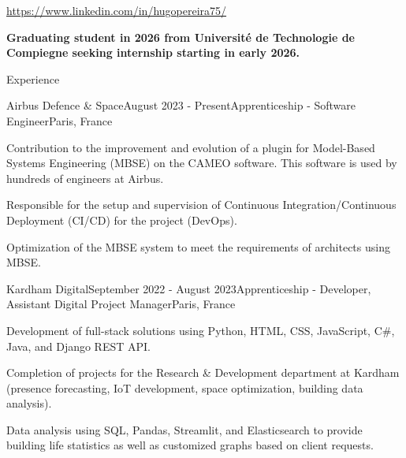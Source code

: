 \documentclass[
	10pt,
]{style} %
\begin{document}
\begin{center}
	\url{https://www.linkedin.com/in/hugopereira75/}
\end{center}

\begin{center}
	\textbf{Graduating student in 2026 from Université de Technologie de Compiegne seeking internship starting in early 2026.}
\end{center}


\begin{rSection}{Experience}

	\begin{rSubsection}{Airbus Defence \& Space}{August 2023 - Present}{Apprenticeship - Software Engineer}{Paris, France}
		\item Contribution to the improvement and evolution of a plugin for Model-Based Systems Engineering (MBSE) on the CAMEO software. This software is used by hundreds of engineers at Airbus.
		\item Responsible for the setup and supervision of Continuous Integration/Continuous Deployment (CI/CD) for the project (DevOps).
		\item Optimization of the MBSE system to meet the requirements of architects using MBSE.
	\end{rSubsection}


	\begin{rSubsection}{Kardham Digital}{September 2022 - August 2023}{Apprenticeship - Developer, Assistant Digital Project Manager}{Paris, France}
		\item Development of full-stack solutions using Python, HTML, CSS, JavaScript, C\#, Java, and Django REST API.
		\item Completion of projects for the Research \& Development department at Kardham (presence forecasting, IoT development, space optimization, building data analysis).
		\item Data analysis using SQL, Pandas, Streamlit, and Elasticsearch to provide building life statistics as well as customized graphs based on client requests.
	\end{rSubsection}



\end{rSection}
\end{document}
